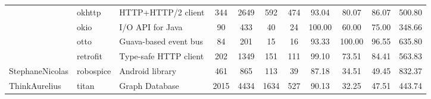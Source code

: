 \begin{table*}[]
{\begin{tabular}{lllcccccccc}
                            & okhttp                                                        & HTTP+HTTP/2 client                                                        & 344            & 2649            & 592                                                                   & 474            & 93.04          & 80.07          & 86.07          & 500.80                                               \\
                            & okio                                                          & I/O API for Java                                                          & 90             & 433             & 40                                                                    & 24             & 100.00         & 60.00          & 75.00          & 348.66                                               \\
                            & otto                                                          & Guava-based event bus                                                     & 84             & 201             & 15                                                                    & 16             & 93.33          & 100.00         & 96.55          & 635.80                                               \\
                            & retrofit                                                      & Type-safe HTTP client                                                     & 202            & 1349            & 151                                                                   & 111            & 99.10          & 73.51          & 84.41          & 563.83                                               \\ \hline
StephaneNicolas             & robospice                                                     & Android library                                                           & 461            & 865             & 113                                                                   & 39             & 87.18          & 34.51          & 49.45          & 832.37                                               \\ \hline
ThinkAurelius               & titan                                                         & Graph Database                                                            & 2015           & 4434            & 1634                                                                  & 527            & 90.13          & 32.25          & 47.51          & 443.74                                               \\ \hline

\end{tabular}}
\end{table*}
